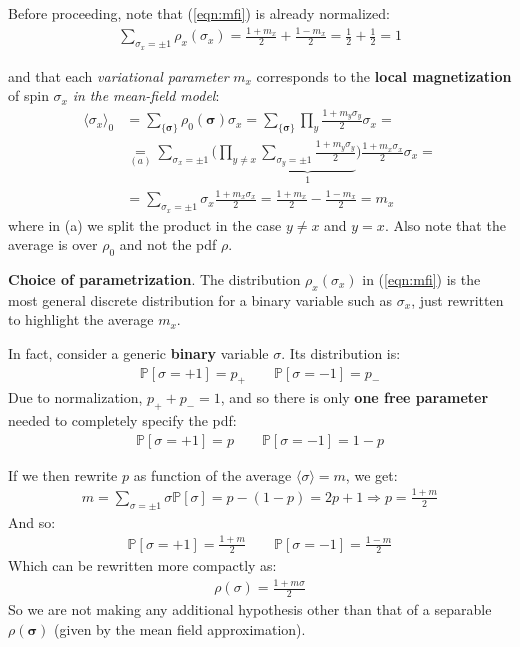 \documentclass[../../main.tex]{subfiles}
\begin{document}
Before proceeding, note that (\ref{eqn:mfi}) is already normalized:
\begin{align*}
    \sum_{\sigma_x = \pm 1}\rho_x(\sigma_x) = \frac{1+m_x}{2} + \frac{1-m_x}{2} = \frac{1}{2} + \frac{1}{2} = 1    
\end{align*}

and that each \textit{variational parameter} $m_x$ corresponds to the \textbf{local magnetization} of spin $\sigma_x$ \textit{in the mean-field model}: 
\begin{align}\nonumber
    \langle \sigma_x \rangle_0 &= \sum_{\{\bm{\sigma}\}} \rho_0(\bm{\sigma}) \sigma_x = \sum_{\{\bm{\sigma}\}} \prod_y \frac{1+m_y \sigma_y}{2} \sigma_x =  \\ \nonumber
    &\underset{(a)}{=}  \sum_{\sigma_x = \pm 1} \Bigg(\prod_{y \neq x} \underbrace{\sum_{\sigma_y = \pm 1} \frac{1+m_y \sigma_y}{2}}_{1} \Bigg) \frac{1+m_x \sigma_x}{2} \sigma_x =\\ 
    &=
    \sum_{\sigma_x = \pm 1} \sigma_x \frac{1+m_x \sigma_x}{2} = \frac{1+m_x}{2} - \frac{1-m_x}{2} =  m_x \label{eqn:local-average}
\end{align}
where in (a) we split the product in the case $y \neq x$ and $y = x$. Also note that the average is over $\rho_0$ and not the  pdf $\rho$.

\begin{expl}\textbf{Choice of parametrization}.  
    The distribution $\rho_x(\sigma_x)$ in (\ref{eqn:mfi}) is the most general discrete distribution for a binary variable such as $\sigma_x$, just rewritten to highlight the average $m_x$.

    In fact, consider a generic \textbf{binary} variable $\sigma$. Its distribution is:
    \begin{align*}
        \mathbb{P}[\sigma = +1] = p_+ \qquad \mathbb{P}[\sigma=-1] = p_-
    \end{align*}
    Due to normalization, $p_+ + p_- = 1$, and so there is only \textbf{one free parameter} needed to completely specify the pdf:
    \begin{align*}
        \mathbb{P}[\sigma = +1] = p \qquad \mathbb{P}[\sigma = -1] = 1-p
    \end{align*}  
    
    If we then rewrite $p$ as function of the average $\langle \sigma \rangle = m$, we get:
    \begin{align*}
        m = \sum_{\sigma = \pm 1} \sigma\mathbb{P}[\sigma] = p - (1-p) = 2p + 1 \Rightarrow p = \frac{1+m}{2} 
    \end{align*}
    And so:
    \begin{align*}
        \mathbb{P}[\sigma = +1] = \frac{1+m}{2} \qquad \mathbb{P}[\sigma = -1] = \frac{1-m}{2}  
    \end{align*}
    Which can be rewritten more compactly as:
    \begin{align*}
        \rho(\sigma) = \frac{1+m \sigma}{2} 
    \end{align*}
    So we are not making any additional hypothesis other than that of a separable $\rho(\bm{\sigma})$ (given by the mean field approximation).
\end{expl}
\end{document}
